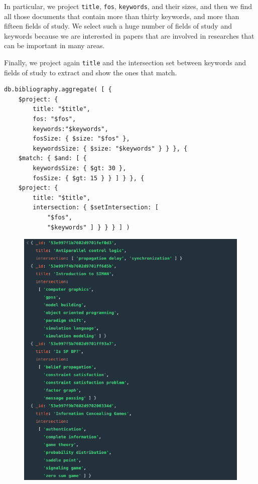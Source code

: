 \begin{enumerate}
    In particular, we project \verb|title|, \verb|fos|, \verb|keywords|, and their sizes, and then we find all those documents that contain more than thirty keywords, and more than fifteen fields of study.
    We select such a huge number of fields of study and keywords because we are interested in papers that are involved in researches that can be important in many areas.

    Finally, we project again \verb|title| and the intersection set between keywords and fields of study to extract and show the ones that match.
    \begin{lstlisting}[label={lst:lstlisting65}]
db.bibliography.aggregate( [ {
    $project: {
        title: "$title",
        fos: "$fos",
        keywords:"$keywords",
        fosSize: { $size: "$fos" },
        keywordsSize: { $size: "$keywords" } } }, {
    $match: { $and: [ {
        keywordsSize: { $gt: 30 },
        fosSize: { $gt: 15 } } ] } }, {
    $project: {
        title: "$title",
        intersection: { $setIntersection: [
            "$fos",
            "$keywords" ] } } } ] )
    \end{lstlisting}
    \begin{figure}[H]
        \begin{center}
            \includegraphics[width=0.3\linewidth]{ImagesMongoDB/query8mongo}
            \label{fig:query8mongo}
        \end{center}
    \end{figure}


\end{enumerate}
